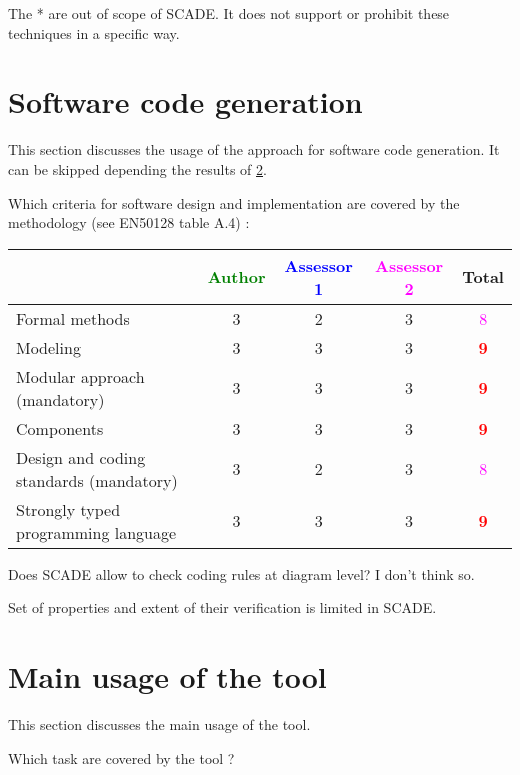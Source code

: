 \begin{author_comment}
The * are out of scope of SCADE. It does not support or prohibit these techniques in a specific way.   
\end{author_comment}


\section{Software code generation}
This section discusses the usage of the approach for software code generation.
It can be skipped depending the results of \ref{main_usage}.

Which criteria for software design and implementation are covered by the methodology
(see EN50128 table A.4) :

\begin{tabular}{|l | c | c | c | c|}
\hline
& \textcolor{green}{Author} & \textcolor{blue}{Assessor 1} & \textcolor{magenta}{Assessor 2} & Total \\
\hline
Formal methods  & 3    & 2    &3 & \textcolor{magenta}{8} \\
\hline 
Modeling  & 3    & 3    &3 & \textcolor{red}{\textbf{9}} \\
\hline
Modular approach (mandatory) & 3    & 3    &3 & \textcolor{red}{\textbf{9}} \\
\hline
Components & 3    & 3    &3 & \textcolor{red}{\textbf{9}} \\
\hline
Design and coding standards (mandatory) & 3    & 2    &3 & \textcolor{magenta}{8} \\
\hline
Strongly typed programming language & 3    & 3    &3 & \textcolor{red}{\textbf{9}} \\
\hline
\end{tabular}

\begin{assessor1}
  Does SCADE allow to check coding rules at diagram level? I don't
  think so.

  Set of properties and extent of their verification is limited in
  SCADE.
\end{assessor1}



\section{Main usage of the tool}
\label{main_usage}

This section discusses the main usage of the tool.

Which task are covered by the tool ?


